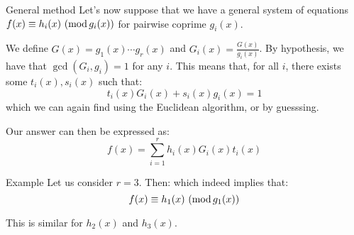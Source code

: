 \documentclass[a4paper]{article}
\begin{document}
\begin{parag}{General method}
    Let's now suppose that we have a general system of equations $\congruent{f\left(x\right)}{h_i\left(x\right)}{g_i\left(x\right)}$ for pairwise coprime $g_i\left(x\right)$. 

    We define $G\left(x\right) = g_1\left(x\right) \cdots g_r\left(x\right)$ and $G_i\left(x\right) = \frac{G\left(x\right)}{g_i\left(x\right)}$. By hypothesis, we have that $\gcd\left(G_i, g_i\right) = 1$ for any $i$. This means that, for all $i$, there exists some $t_i\left(x\right), s_i\left(x\right)$ such that: 
    \[t_i\left(x\right)G_i\left(x\right) + s_i\left(x\right)g_i\left(x\right) = 1\]
    which we can again find using the Euclidean algorithm, or by guesssing.

    Our answer can then be expressed as:
    \[f\left(x\right) = \sum_{i=1}^{r} h_i\left(x\right)G_i\left(x\right)t_i\left(x\right)\]
    
    \begin{subparag}{Example}
        Let us consider $r = 3$. Then: 
        which indeed implies that: 
        \[\congruent{f\left(x\right)}{h_1\left(x\right)}{g_1\left(x\right)}\]

        This is similar for $h_2\left(x\right)$ and $h_3\left(x\right)$.
    \end{subparag}
\end{parag}
\end{document}
